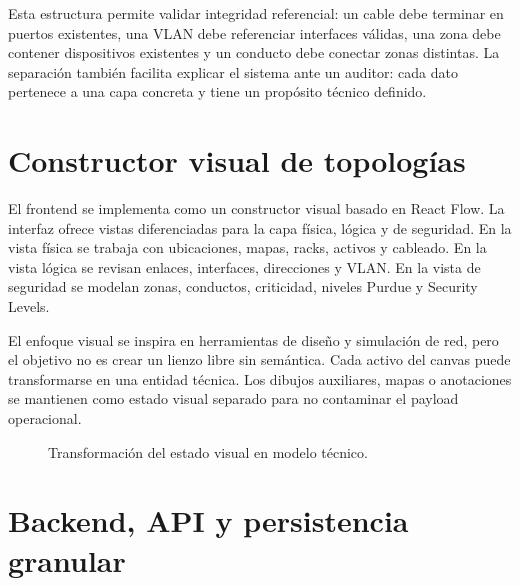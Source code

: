 Esta estructura permite validar integridad referencial: un cable debe terminar en puertos existentes, una VLAN debe referenciar interfaces válidas, una zona debe contener dispositivos existentes y un conducto debe conectar zonas distintas. La separación también facilita explicar el sistema ante un auditor: cada dato pertenece a una capa concreta y tiene un propósito técnico definido.

\section{Constructor visual de topologías} \label{sec:constructor-visual}

El frontend se implementa como un constructor visual basado en React Flow. La interfaz ofrece vistas diferenciadas para la capa física, lógica y de seguridad. En la vista física se trabaja con ubicaciones, mapas, racks, activos y cableado. En la vista lógica se revisan enlaces, interfaces, direcciones y VLAN. En la vista de seguridad se modelan zonas, conductos, criticidad, niveles Purdue y Security Levels.

El enfoque visual se inspira en herramientas de diseño y simulación de red, pero el objetivo no es crear un lienzo libre sin semántica. Cada activo del canvas puede transformarse en una entidad técnica. Los dibujos auxiliares, mapas o anotaciones se mantienen como estado visual separado para no contaminar el payload operacional.

\begin{figure}[H]
    \centering
    \setlength{\fboxsep}{8pt}
    \caption{Transformación del estado visual en modelo técnico.}
    \label{fig:estado-visual-modelo}
\end{figure}

\section{Backend, API y persistencia granular} \label{sec:backend-api}

